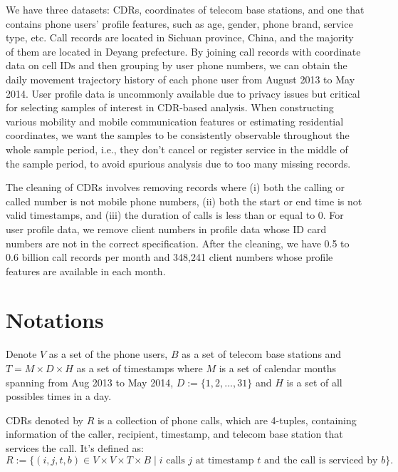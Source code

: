 We have three datasets: CDRs, coordinates of telecom base stations, and one that contains phone users' profile features, such as age, gender, phone brand, service type, etc.
Call records are located in Sichuan province, China, and the majority of them are located in Deyang prefecture.
By joining call records with coordinate data on cell IDs and then grouping by user phone numbers, we can obtain the daily movement trajectory history of each phone user from August 2013 to May 2014.
User profile data is uncommonly available due to privacy issues but critical for selecting samples of interest in CDR-based analysis.
When constructing various mobility and mobile communication features or estimating residential coordinates, we want the samples to be consistently observable throughout the whole sample period, i.e., they don't cancel or register service in the middle of the sample period, to avoid spurious analysis due to too many missing records.

The cleaning of CDRs involves removing records where (i) both the calling or called number is not mobile phone numbers, (ii) both the start or end time is not valid timestamps, and (iii) the duration of calls is less than or equal to 0.
For user profile data, we remove client numbers in profile data whose ID card numbers are not in the correct specification. After the cleaning, we have 0.5 to 0.6 billion call records per month and 348,241 client numbers whose profile features are available in each month.


\section{Notations}\label{sec:notations}
Denote $V$ as a set of the phone users, $B$ as a set of telecom base stations and $T = M \times D \times H$ as a set of timestamps where $M$ is a set of calendar months spanning from Aug 2013 to May 2014, $D := \{1, 2, ..., 31\}$ and $H$ is a set of all possibles times in a day.

\begin{definition}
CDRs denoted by $R$ is a collection of phone calls, which are 4-tuples, containing information of the caller, recipient, timestamp, and telecom base station that services the call. It's defined as:
$$
R
:=
\{
  (i, j, t, b) \in V \times V \times T \times B
  \mid
  i \text{ calls } j \text{ at timestamp } t \text{ and }
  \text{the call is serviced by } b
\}.
$$
\end{definition}

